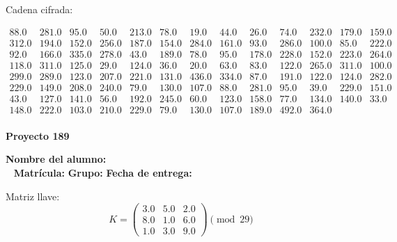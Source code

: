 \documentclass[12pt]{article}
\begin{document}
Cadena cifrada:
\begin{center}
$\begin{array}{lllllllllllll}
88.0 & 281.0 & 95.0 & 50.0 & 213.0 & 78.0 & 19.0 & 44.0 & 26.0 & 74.0 & 232.0 & 179.0 & 159.0\\
312.0 & 194.0 & 152.0 & 256.0 & 187.0 & 154.0 & 284.0 & 161.0 & 93.0 & 286.0 & 100.0 & 85.0 & 222.0\\
92.0 & 166.0 & 335.0 & 278.0 & 43.0 & 189.0 & 78.0 & 95.0 & 178.0 & 228.0 & 152.0 & 223.0 & 264.0\\
118.0 & 311.0 & 125.0 & 29.0 & 124.0 & 36.0 & 20.0 & 63.0 & 83.0 & 122.0 & 265.0 & 311.0 & 100.0\\
299.0 & 289.0 & 123.0 & 207.0 & 221.0 & 131.0 & 436.0 & 334.0 & 87.0 & 191.0 & 122.0 & 124.0 & 282.0\\
229.0 & 149.0 & 208.0 & 240.0 & 79.0 & 130.0 & 107.0 & 88.0 & 281.0 & 95.0 & 39.0 & 229.0 & 151.0\\
43.0 & 127.0 & 141.0 & 56.0 & 192.0 & 245.0 & 60.0 & 123.0 & 158.0 & 77.0 & 134.0 & 140.0 & 33.0\\
148.0 & 222.0 & 103.0 & 210.0 & 229.0 & 79.0 & 130.0 & 107.0 & 189.0 & 492.0 & 364.0\\
\end{array}$
\end{center}

\newpage


\textbf{Proyecto 189}

\textbf{Nombre del alumno:} \underline{\hspace{13cm}}\\\
\vspace{1cm}
\textbf{Matrícula:} \underline{\hspace{4cm}} \hspace{1cm}
\textbf{Grupo:} \underline{\hspace{2cm}}
\textbf{Fecha de entrega:} \underline{\hspace{2cm}}

\medskip

Matriz llave:
\[
K = \begin{pmatrix}
3.0 & 5.0 & 2.0\\
8.0 & 1.0 & 6.0\\
1.0 & 3.0 & 9.0
\end{pmatrix} \pmod{29}
\]
\end{document}
